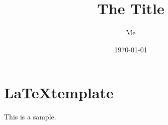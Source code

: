 \documentclass{article}
\title{The Title}
\author{Me}
\date{\today}
\begin{document}
\maketitle

\section{\LaTeX template}
This is a sample.

\printbibliography
\end{document}
